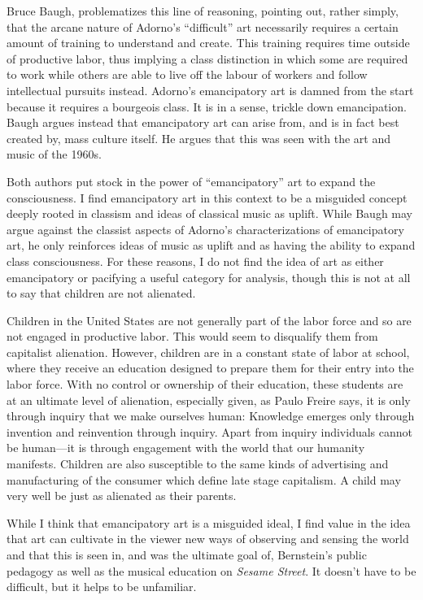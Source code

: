 \documentclass[12pt,letterpaper]{article}
\begin{document}
	Bruce Baugh, problematizes this line of reasoning, pointing out, rather
	simply, that the arcane nature of Adorno's ``difficult'' art necessarily
	requires a certain amount of training to understand and create. This 
	training requires time outside of productive labor, thus implying a 
	class distinction in which some are required to work while others are 
	able to live off the labour of workers and follow intellectual pursuits
	instead. Adorno's emancipatory art is damned from the start because it 
	requires a bourgeois class. \autocite[74]{Baugh} It is in a sense, 
	trickle down emancipation. Baugh argues instead that emancipatory art 
	can arise from,
	and is in fact best created by, mass culture itself. He argues that this
	was seen with the art and music of the 1960s.\autocite[77]{Baugh}

	Both authors put stock in the power of ``emancipatory'' art to expand 
	the consciousness. I find emancipatory art in this context to be a 
	misguided concept deeply rooted in classism and ideas of classical music
	as uplift. While Baugh may argue against the classist aspects of Adorno's
	characterizations of emancipatory art, he only reinforces ideas of music 
	as uplift and as having the ability to expand class consciousness.
	For these reasons, I do not 
	find the idea of art as either emancipatory or pacifying a useful
	category for analysis, though this is not at all to say that children
	are not alienated. 

	Children in the United States are not generally part of the labor force 
	and so are not engaged in productive labor. This would seem to 
	disqualify them from capitalist alienation. However, children are in a 
	constant state of labor at school, where they receive an education 
	designed to prepare them for their entry into the labor force. With no 
	control or ownership of their education, these students are at an 
	ultimate level of alienation, especially given, as Paulo Freire says, 
	it is only through inquiry that we make ourselves human: Knowledge 
	emerges only through invention and reinvention through inquiry. Apart 
	from inquiry individuals cannot be human---it is through engagement 
	with the world that our humanity manifests.\autocite[72]{Freire}  
  	Children are also susceptible to the same kinds of advertising and 
	manufacturing of the consumer which define late stage capitalism.  
	A child may very well be just as alienated as their parents.  

	While I think that emancipatory art is a misguided ideal, I find value 
	in the idea that art can cultivate in the viewer new ways of observing
	and sensing the world and that this is seen in, and was the ultimate
	goal of, Bernstein's public pedagogy as well as the musical education 
	on \textit{Sesame Street}. It doesn't have to be difficult, 
	but it helps to be unfamiliar. 
\end{document}
